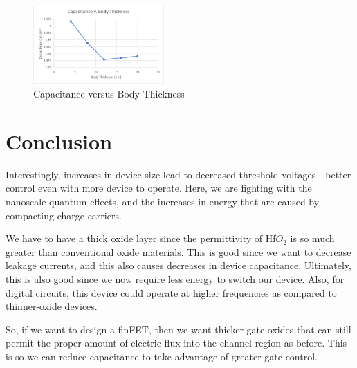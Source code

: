 \documentclass{IEEEtran}
\begin{document}
\begin{figure}[!ht] 
    \centering
    \includegraphics*[width = 5cm]{capvbody.png}
    \caption{Capacitance versus Body Thickness}
    \label{fig:plot}
\end{figure}    

\section{Conclusion}

Interestingly, increases in device size lead to decreased threshold voltages---better control even with more device to operate. Here, we are fighting with the nanoscale quantum effects, and the increases in energy that are caused by compacting charge carriers. 

We have to have a thick oxide layer since the permittivity of Hf\(O_2\) is so much greater than conventional oxide materials. This is good since we want to decrease leakage currents, and this also causes decreases in device capacitance. Ultimately, this is also good since we now require less energy to switch our device. Also, for digital circuits, this device could operate at higher frequencies as compared to thinner-oxide devices.

So, if we want to design a finFET, then we want thicker gate-oxides that can still permit the proper amount of electric flux into the channel region as before. This is so we can reduce capacitance to take advantage of greater gate control. 



\end{document}
